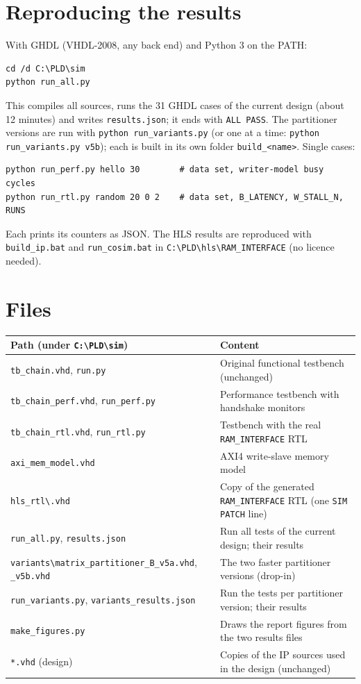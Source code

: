 \documentclass[11pt,a4paper]{article}
\newcommand{\code}[1]{\texttt{#1}}
\begin{document}
\appendix
\section{Reproducing the results}
With GHDL (VHDL-2008, any back end) and Python 3 on the PATH:
\begin{lstlisting}
cd /d C:\PLD\sim
python run_all.py
\end{lstlisting}
This compiles all sources, runs the 31 GHDL cases of the current design (about 12 minutes) and writes \code{results.json}; it ends with \code{ALL PASS}. The partitioner versions are run with \code{python run\_variants.py} (or one at a time: \code{python run\_variants.py v5b}); each is built in its own folder \code{build\_<name>}. Single cases:
\begin{lstlisting}
python run_perf.py hello 30        # data set, writer-model busy cycles
python run_rtl.py random 20 0 2    # data set, B_LATENCY, W_STALL_N, RUNS
\end{lstlisting}
Each prints its counters as JSON. The HLS results are reproduced with \code{build\_ip.bat} and \code{run\_cosim.bat} in \code{C:\textbackslash PLD\textbackslash hls\textbackslash RAM\_INTERFACE} (no licence needed).

\section{Files}
\begin{longtable}{@{}p{}p{}@{}}
\toprule
\textbf{Path (under \code{C:\textbackslash PLD\textbackslash sim})} & \textbf{Content} \\
\midrule
\endhead
\code{tb\_chain.vhd}, \code{run.py} & Original functional testbench (unchanged) \\
\code{tb\_chain\_perf.vhd}, \code{run\_perf.py} & Performance testbench with handshake monitors \\
\code{tb\_chain\_rtl.vhd}, \code{run\_rtl.py} & Testbench with the real \code{RAM\_INTERFACE} RTL \\
\code{axi\_mem\_model.vhd} & AXI4 write-slave memory model \\
\code{hls\_rtl\textbackslash *.vhd} & Copy of the generated \code{RAM\_INTERFACE} RTL (one \code{SIM PATCH} line) \\
\code{run\_all.py}, \code{results.json} & Run all tests of the current design; their results \\
\code{variants\textbackslash}\allowbreak\code{matrix\_partitioner\_B\_v5a.vhd}, \code{\_v5b.vhd} & The two faster partitioner versions (drop-in) \\
\code{run\_variants.py}, \code{variants\_results.json} & Run the tests per partitioner version; their results \\
\code{make\_figures.py} & Draws the report figures from the two results files \\
\code{*.vhd} (design) & Copies of the IP sources used in the design (unchanged) \\
\bottomrule
\end{longtable}
\end{document}
